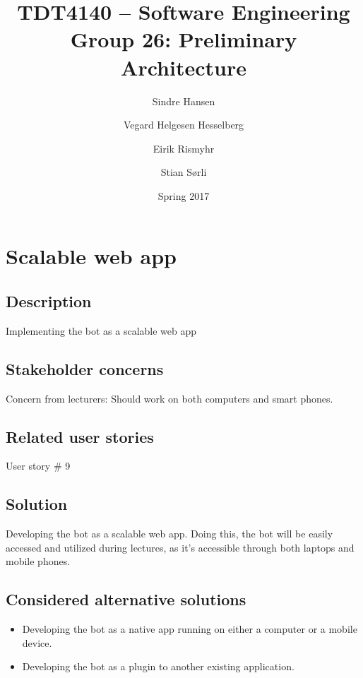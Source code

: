 \documentclass[12pt, a4paper]{article}
\title{TDT4140 -- Software Engineering \\ Group 26: Preliminary Architecture}
\author{Sindre Hansen \and Vegard Helgesen Hesselberg \and Eirik Rismyhr \and Stian Sørli}
\date{Spring 2017}
\begin{document}
\maketitle
\tableofcontents
\thispagestyle{empty}
\clearpage
\setcounter{page}{1}
\section{Scalable web app}
\subsection{Description}
Implementing the bot as a scalable web app
\subsection{Stakeholder concerns}
Concern from lecturers: Should work on both computers and smart phones.
\subsection{Related user stories}
User story \# 9
\subsection{Solution}
Developing the bot as a scalable web app. Doing this, the bot will be easily accessed and utilized during lectures, as it's accessible through both laptops and mobile phones.
\subsection{Considered alternative solutions}
\begin{itemize}
    \item Developing the bot as a native app running on either a computer or a mobile device.
    \item Developing the bot as a plugin to another existing application.
\end{itemize}
\end{document}
